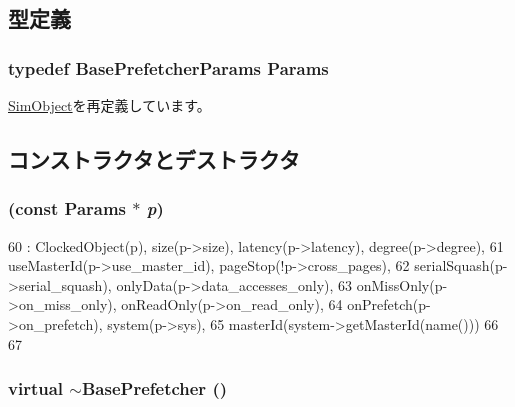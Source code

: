 \subsection{型定義}
\hypertarget{classBasePrefetcher_a46661f02a5642b04fd4e12f645ad9c5c}{
\subsubsection[{Params}]{\setlength{\rightskip}{0pt plus 5cm}typedef BasePrefetcherParams {\bf Params}}}
\label{classBasePrefetcher_a46661f02a5642b04fd4e12f645ad9c5c}


\hyperlink{classSimObject_a0f0761d2db586a23bb2a2880b8f387bb}{SimObject}を再定義しています。

\subsection{コンストラクタとデストラクタ}
\hypertarget{classBasePrefetcher_aff313fac14ed758d8896572ecb0b6bfe}{
\subsubsection[{BasePrefetcher}]{ (const {\bf Params} $\ast$ {\em p})}}
\label{classBasePrefetcher_aff313fac14ed758d8896572ecb0b6bfe}



\begin{DoxyCode}
60     : ClockedObject(p), size(p->size), latency(p->latency), degree(p->degree),
61       useMasterId(p->use_master_id), pageStop(!p->cross_pages),
62       serialSquash(p->serial_squash), onlyData(p->data_accesses_only),
63       onMissOnly(p->on_miss_only), onReadOnly(p->on_read_only),
64       onPrefetch(p->on_prefetch), system(p->sys),
65       masterId(system->getMasterId(name()))
66 {
67 }
\end{DoxyCode}
\hypertarget{classBasePrefetcher_a36880a63235082d98e72895db229946f}{
\subsubsection[{$\sim$BasePrefetcher}]{\setlength{\rightskip}{0pt plus 5cm}virtual $\sim${\bf BasePrefetcher} ()}}
\label{classBasePrefetcher_a36880a63235082d98e72895db229946f}



